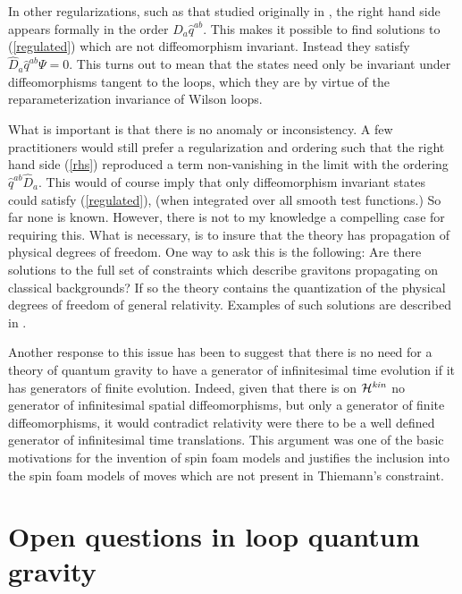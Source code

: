 \documentclass[12pt]{article}
\begin{document}
\begin{enumerate}
 In other regularizations, such as that studied
originally in \cite{tedlee}, the right hand side appears formally in the order 
$\hat{D}_a \hat{q}^{ab}$.  This makes it possible to find solutions to
(\ref{regulated}) which are not diffeomorphism invariant. Instead they 
satisfy  $\hat{D}_a \hat{q}^{ab} \Psi =0 $.  This turns out to mean that the states need
only be invariant under diffeomorphisms tangent to the loops, which they are by
virtue of the reparameterization invariance of Wilson loops. 

What is important is that  there is no anomaly or inconsistency.
A few  practitioners would still prefer a regularization
and ordering such that the right hand side (\ref{rhs}) reproduced a term non-vanishing
in the limit with the ordering  $ \hat{q}^{ab} \hat{D}_a  $. This would of course imply
that only diffeomorphism invariant states could satisfy (\ref{regulated}), (when  integrated
over all smooth test functions.)  So far none is known. However, there is not to my knowledge
a compelling case for requiring this. What is necessary, is to insure that the theory
has propagation of physical degrees of freedom. One way to ask this is the following:
Are there solutions to the full set of constraints which describe gravitons propagating
on classical backgrounds?  If so the theory contains the quantization of the physical
degrees of freedom of general relativity.  Examples of such solutions are described
in \cite{positive}.  

Another response to this issue has been to suggest that there is no need for
a theory of quantum gravity to have a generator of infinitesimal time
evolution if it has generators of finite evolution.  Indeed, given that there is
on ${\cal H}^{\it kin}$
no generator of infinitesimal spatial diffeomorphisms, but only a generator
of finite diffeomorphisms, it would contradict relativity were there to be 
a well defined generator of infinitesimal  time translations.  This argument was one of the basic motivations for the invention of spin foam models and justifies the
inclusion into the spin foam models of moves which are not present in
Thiemann's constraint\cite{F-foam,RR-foam}. 




\end{enumerate}

  
\section{Open questions in loop quantum gravity}
\end{document}
